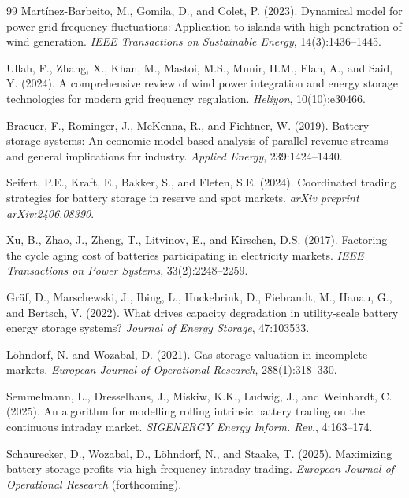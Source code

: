 \documentclass[10pt,twocolumn]{article}
\begin{document}

\begin{thebibliography}{99}
Martínez-Barbeito, M., Gomila, D., and Colet, P. (2023).
Dynamical model for power grid frequency fluctuations: Application to islands with high penetration of wind generation.
\textit{IEEE Transactions on Sustainable Energy}, 14(3):1436--1445.

Ullah, F., Zhang, X., Khan, M., Mastoi, M.S., Munir, H.M., Flah, A., and Said, Y. (2024).
A comprehensive review of wind power integration and energy storage technologies for modern grid frequency regulation.
\textit{Heliyon}, 10(10):e30466.

Braeuer, F., Rominger, J., McKenna, R., and Fichtner, W. (2019).
Battery storage systems: An economic model-based analysis of parallel revenue streams and general implications for industry.
\textit{Applied Energy}, 239:1424--1440.

Seifert, P.E., Kraft, E., Bakker, S., and Fleten, S.E. (2024).
Coordinated trading strategies for battery storage in reserve and spot markets.
\textit{arXiv preprint arXiv:2406.08390}.

Xu, B., Zhao, J., Zheng, T., Litvinov, E., and Kirschen, D.S. (2017).
Factoring the cycle aging cost of batteries participating in electricity markets.
\textit{IEEE Transactions on Power Systems}, 33(2):2248--2259.

Gräf, D., Marschewski, J., Ibing, L., Huckebrink, D., Fiebrandt, M., Hanau, G., and Bertsch, V. (2022).
What drives capacity degradation in utility-scale battery energy storage systems?
\textit{Journal of Energy Storage}, 47:103533.

Löhndorf, N. and Wozabal, D. (2021).
Gas storage valuation in incomplete markets.
\textit{European Journal of Operational Research}, 288(1):318--330.

Semmelmann, L., Dresselhaus, J., Miskiw, K.K., Ludwig, J., and Weinhardt, C. (2025).
An algorithm for modelling rolling intrinsic battery trading on the continuous intraday market.
\textit{SIGENERGY Energy Inform. Rev.}, 4:163--174.

Schaurecker, D., Wozabal, D., Löhndorf, N., and Staake, T. (2025).
Maximizing battery storage profits via high-frequency intraday trading.
\textit{European Journal of Operational Research} (forthcoming).
\end{thebibliography}
\end{document}

